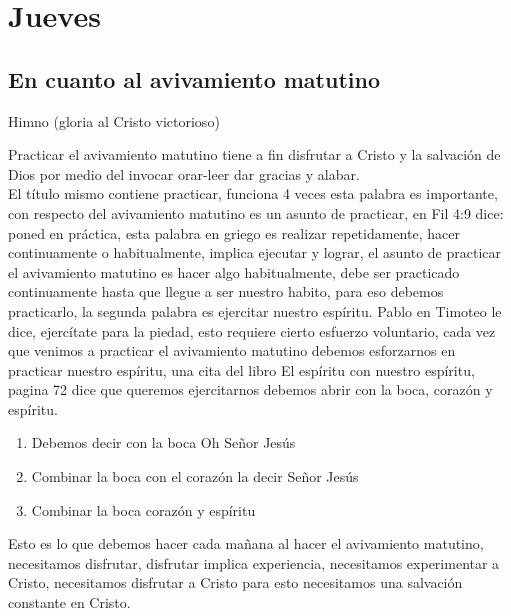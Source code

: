 \documentclass[12pt]{article}
\begin{document}
\section*{Jueves}

\subsection*{En cuanto al avivamiento matutino}

Himno (gloria al Cristo victorioso)

Practicar el avivamiento matutino tiene a fin disfrutar a Cristo y la salvación de Dios por medio del invocar orar-leer dar gracias y alabar.\\

El título mismo contiene practicar, funciona 4 veces esta palabra es importante, con respecto del avivamiento matutino es un asunto de practicar, en Fil 4:9 dice: poned en práctica, esta palabra en griego es realizar repetidamente, hacer continuamente o habitualmente, implica ejecutar y lograr, el asunto de practicar el avivamiento matutino es hacer algo habitualmente, debe ser practicado continuamente hasta que llegue a ser nuestro habito, para eso debemos practicarlo, la segunda palabra es ejercitar nuestro espíritu. Pablo en Timoteo le dice, ejercítate para la piedad, esto requiere cierto esfuerzo voluntario, cada vez que venimos a practicar el avivamiento matutino debemos esforzarnos en practicar nuestro espíritu, una cita del libro El espíritu con nuestro espíritu, pagina 72 dice que queremos ejercitarnos debemos abrir con la boca, corazón y espíritu.\\

\begin{enumerate}
\item Debemos decir con la boca Oh Señor Jesús

\item Combinar la boca con el corazón la decir Señor Jesús

\item Combinar la boca corazón y espíritu

\end{enumerate}

Esto es lo que debemos hacer cada mañana al hacer el avivamiento matutino, necesitamos disfrutar, disfrutar implica experiencia, necesitamos experimentar a Cristo, necesitamos disfrutar a Cristo para esto necesitamos una salvación constante en Cristo.\\
\end{document}
